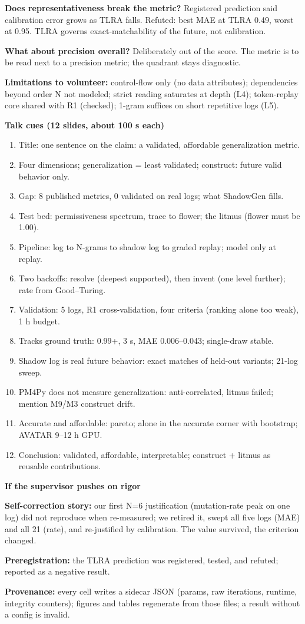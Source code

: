 \documentclass[10pt]{article}
\newcommand{\hdr}[1]{\vspace{5pt}\noindent\textcolor{hd}{\textbf{\large #1}}\par\vspace{2pt}}
\newcommand{\kv}[2]{\noindent\textbf{#1} #2\par}
\begin{document}
\kv{Does representativeness break the metric?}{Registered prediction said calibration error grows as TLRA falls. Refuted: best MAE at TLRA 0.49, worst at 0.95. TLRA governs exact-matchability of the future, not calibration.}
\kv{What about precision overall?}{Deliberately out of the score. The metric is to be read next to a precision metric; the quadrant stays diagnostic.}
\kv{Limitations to volunteer:}{control-flow only (no data attributes); dependencies beyond order N not modeled; strict reading saturates at depth (L4); token-replay core shared with R1 (checked); 1-gram suffices on short repetitive logs (L5).}

\hdr{Talk cues (12 slides, about 100 s each)}
\begin{enumerate}
\item Title: one sentence on the claim: a validated, affordable generalization metric.
\item Four dimensions; generalization = least validated; construct: future valid behavior only.
\item Gap: 8 published metrics, 0 validated on real logs; what ShadowGen fills.
\item Test bed: permissiveness spectrum, trace to flower; the litmus (flower must be 1.00).
\item Pipeline: log to N-grams to shadow log to graded replay; model only at replay.
\item Two backoffs: resolve (deepest supported), then invent (one level further); rate from Good--Turing.
\item Validation: 5 logs, R1 cross-validation, four criteria (ranking alone too weak), 1 h budget.
\item Tracks ground truth: 0.99+, 3 s, MAE 0.006--0.043; single-draw stable.
\item Shadow log is real future behavior: exact matches of held-out variants; 21-log sweep.
\item PM4Py does not measure generalization: anti-correlated, litmus failed; mention M9/M3 construct drift.
\item Accurate and affordable: pareto; alone in the accurate corner with bootstrap; AVATAR 9--12 h GPU.
\item Conclusion: validated, affordable, interpretable; construct + litmus as reusable contributions.
\end{enumerate}

\hdr{If the supervisor pushes on rigor}
\kv{Self-correction story:}{our first N=6 justification (mutation-rate peak on one log) did not reproduce when re-measured; we retired it, swept all five logs (MAE) and all 21 (rate), and re-justified by calibration. The value survived, the criterion changed.}
\kv{Preregistration:}{the TLRA prediction was registered, tested, and refuted; reported as a negative result.}
\kv{Provenance:}{every cell writes a sidecar JSON (params, raw iterations, runtime, integrity counters); figures and tables regenerate from those files; a result without a config is invalid.}
\end{document}
